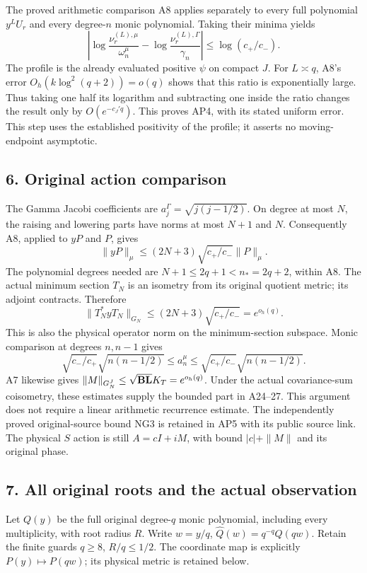\documentclass[11pt]{article}
\begin{document}
The proved arithmetic comparison A8 applies separately to every full polynomial \(y^LU_r\) and every degree-\(n\) monic polynomial. Taking their minima yields \[
\left|\log\frac{\nu_r^{(L),\mu}}{\omega_n^\mu}
-\log\frac{\nu_r^{(L),\Gamma}}{\gamma_n}\right|
\le\log(c_+/c_-).
\tag{AMV15}
\] The profile is the already evaluated positive \(\psi\) on compact \(J\). For \(L\asymp q\), A8's error \(O_h(k\log^2(q+2))=o(q)\) shows that this ratio is exponentially large. Thus taking one half its logarithm and subtracting one inside the ratio changes the result only by \(O(e^{-c_J' q})\). This proves AP4, with its stated uniform error. This step uses the established positivity of the profile; it asserts no moving-endpoint asymptotic.

\subsection{6. Original action comparison}\label{original-action-comparison}

The Gamma Jacobi coefficients are \(a_j^\Gamma=\sqrt{j(j-1/2)}\). On degree at most \(N\), the raising and lowering parts have norms at most \(N+1\) and \(N\). Consequently A8, applied to \(yP\) and \(P\), gives \[
\|yP\|_\mu\le(2N+3)\sqrt{c_+/c_-}\|P\|_\mu.
\] The polynomial degrees needed are \(N+1\le2q+1<n_*=2q+2\), within A8. The actual minimum section \(T_N\) is an isometry from its original quotient metric; its adjoint contracts. Therefore \[
\|T_N^*yT_N\|_{G_N}
\le(2N+3)\sqrt{c_+/c_-}=e^{o_h(q)}.
\tag{AMV16}
\] This is also the physical operator norm on the minimum-section subspace. Monic comparison at degrees \(n,n-1\) gives \[
\sqrt{c_-/c_+}\sqrt{n(n-1/2)}
\le a_n^\mu\le\sqrt{c_+/c_-}\sqrt{n(n-1/2)}.
\] A7 likewise gives \(\|M\|_{G_N^J}\le\sqrt{{\bf B}{\bf L}}K_T=e^{o_h(q)}\). Under the actual covariance-sum coisometry, these estimates supply the bounded part in A24--27. This argument does not require a linear arithmetic recurrence estimate. The independently proved original-source bound NG3 is retained in AP5 with its public source link. The physical \(S\) action is still \(A=cI+iM\), with bound \(|c|+\|M\|\) and its original phase.

\subsection{7. All original roots and the actual observation}\label{all-original-roots-and-the-actual-observation}

Let \(Q(y)\) be the full original degree-\(q\) monic polynomial, including every multiplicity, with root radius \(R\). Write \(w=y/q\), \(\widehat Q(w)=q^{-q}Q(qw)\). Retain the finite guards \(q\ge8\), \(R/q\le1/2\). The coordinate map is explicitly \(P(y)\mapsto P(qw)\); its physical metric is retained below.
\end{document}
